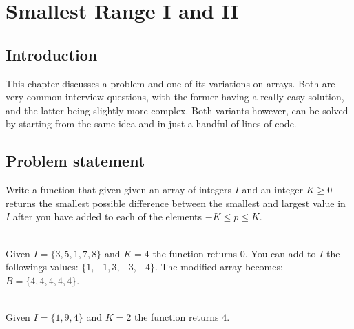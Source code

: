 %



\chapter{Smallest Range \RN{1} and \RN{2}}
\label{ch:smallest_range}
\section*{Introduction}
This chapter discusses a problem and one of its variations on arrays. Both are very common interview
questions, with the former having a really easy solution, and the latter being slightly more
complex. Both variants however, can be solved by starting from the same idea and in just a handful
of lines of code.

\section{Problem statement}
\begin{exercise}
\label{example:smallest_range:exercice1}
Write a function that given given an array of integers $I$ and an integer $K \geq 0$ returns the
smallest possible difference between the smallest and largest value in $I$ after you have added to
each of the elements $-K \leq p \leq K$.

	\begin{example}
		\label{example:smallest_range:example1}
		\hfill \\
		Given $I = \{3,5,1,7,8\}$ and $K=4$ the function returns $0$. You can add to $I$ the
		followings values: $\{1,-1,3,-3,-4\}$. The modified array becomes: $B=\{4,4,4,4,4\}$. 
	\end{example}

	\begin{example}
		\label{example:smallest_range:example2}
		\hfill \\
		Given $I = \{1,9,4\}$ and $K=2$ the function returns $4$.
	\end{example}
\end{exercise}

